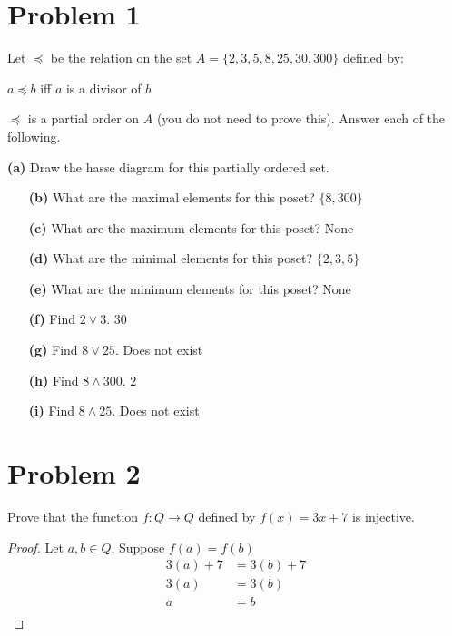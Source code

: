 \documentclass{article}
\newenvironment{problem}[1]{
  \nobreak\section*{Problem #1}
}{}
\begin{document}
  \begin{problem}{1}
    Let $\preceq$ be the relation on the set $A = \{2, 3, 5, 8, 25, 30, 300\}$ defined by:
    \begin{center}
      $a \preceq b$ iff $a$ is a divisor of $b$
    \end{center}
    $\preceq$ is a partial order on $A$ (you do not need to prove this).  Answer each of the following.

    \begin{flushleft}
      \textbf{(a)} Draw the hasse diagram for this partially ordered set.
    \end{flushleft}

    \begin{center}
    \end{center}

    \begin{enumerate}
      \item[\textbf{(b)}] What are the maximal elements for this poset? $\{8, 300\}$
      \item[\textbf{(c)}] What are the maximum elements for this poset? None
      \item[\textbf{(d)}] What are the minimal elements for this poset? $\{2, 3, 5\}$
      \item[\textbf{(e)}] What are the minimum elements for this poset? None
      \item[\textbf{(f)}] Find $2 \vee 3$. $30$
      \item[\textbf{(g)}] Find $8 \vee 25$. Does not exist
      \item[\textbf{(h)}] Find $8 \wedge 300$. $2$ 
      \item[\textbf{(i)}] Find $8 \wedge 25$. Does not exist 
    \end{enumerate}
  \end{problem}

  \begin{problem}{2}
    Prove that the function $f : Q \rightarrow Q$ defined by $f(x) = 3x + 7$ is injective.
    \begin{proof}
      Let $a, b \in Q$, Suppose $f(a) = f(b)$
      \begin{equation*}
        \begin{split}
          3(a) + 7 & = 3(b) + 7\\
          3(a) & = 3(b)\\
          a & = b\\
        \end{split}
      \end{equation*}
    \end{proof}
  \end{problem}
\end{document}
